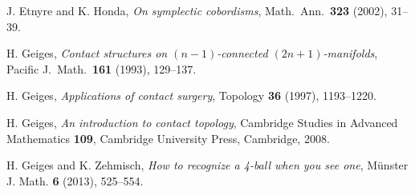 \documentclass[12pt]{amsart}
\theoremstyle{remark}
\begin{document}
\begin{thebibliography}{999}
 
 J. Etnyre and K. Honda,
{\em On symplectic cobordisms},
Math.~Ann.~{\bf323} (2002), 31--39. 






 H. Geiges, {\em Contact structures on $(n{-}1)$-connected $(2n{+}1)$-manifolds}, Pacific J.~Math.~\textbf{161} (1993), 129--137.

 H. Geiges, {\em Applications of contact surgery}, Topology {\bf 36} (1997), 1193--1220. 



 H. Geiges, {\em An introduction to contact topology}, Cambridge Studies in Advanced Mathematics \textbf{109}, Cambridge University Press, Cambridge, 2008.

H. Geiges and K. Zehmisch, 
{\em How to recognize a 4-ball when you see one},
 M\"unster J. Math. {\bf 6} (2013), 525--554.




\end{thebibliography}
\end{document}
